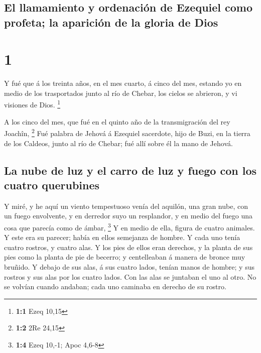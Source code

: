 \hypertarget{el-llamamiento-y-ordenaciuxf3n-de-ezequiel-como-profeta-la-apariciuxf3n-de-la-gloria-de-dios}{%
\subsection{El llamamiento y ordenación de Ezequiel como profeta; la
aparición de la gloria de
Dios}\label{el-llamamiento-y-ordenaciuxf3n-de-ezequiel-como-profeta-la-apariciuxf3n-de-la-gloria-de-dios}}

\hypertarget{section}{%
\section{1}\label{section}}

 Y fué que á los treinta años, en el mes cuarto, á cinco del
mes, estando yo en medio de los trasportados junto al río de Chebar, los
cielos se abrieron, y vi visiones de Dios. \footnote{\textbf{1:1} Ezeq
  10,15}

 A los cinco del mes, que fué en el quinto año de la
transmigración del rey Joachîn, \footnote{\textbf{1:2} 2Re 24,15}
 Fué palabra de Jehová á Ezequiel sacerdote, hijo de Buzi,
en la tierra de los Caldeos, junto al río de Chebar; fué allí sobre él
la mano de Jehová.

\hypertarget{la-nube-de-luz-y-el-carro-de-luz-y-fuego-con-los-cuatro-querubines}{%
\subsection{La nube de luz y el carro de luz y fuego con los cuatro
querubines}\label{la-nube-de-luz-y-el-carro-de-luz-y-fuego-con-los-cuatro-querubines}}

 Y miré, y he aquí un viento tempestuoso venía del aquilón,
una gran nube, con un fuego envolvente, y en derredor suyo un
resplandor, y en medio del fuego una cosa que parecía como de ámbar,
\footnote{\textbf{1:4} Ezeq 10,-1; Apoc 4,6-8}  Y en medio
de ella, figura de cuatro animales. Y este era su parecer; había en
ellos semejanza de hombre.  Y cada uno tenía cuatro rostros,
y cuatro alas.  Y los pies de ellos eran derechos, y la
planta de sus pies como la planta de pie de becerro; y centelleaban á
manera de bronce muy bruñido.  Y debajo de sus alas, á sus
cuatro lados, tenían manos de hombre; y sus rostros y sus alas por los
cuatro lados.  Con las alas se juntaban el uno al otro. No
se volvían cuando andaban; cada uno caminaba en derecho de su rostro.

